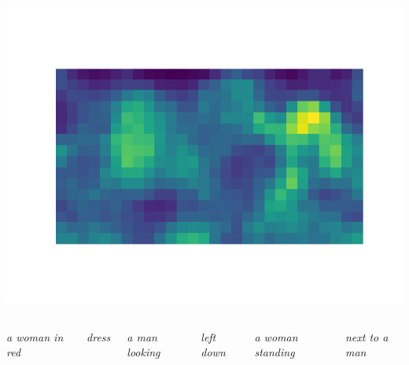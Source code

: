 \documentclass{beamer}
\begin{document}
\begin{frame}
\begin{columns}[c]
		\centerline{\includegraphics[scale=0.28]{images/example_3.png}}
	\end{columns}

	\begin{columns}[c]
		\centerline{\textit{a woman in red}}
		\centerline{\textit{dress}}

		\centerline{\textit{a man looking}}
		\centerline{\textit{left down}}

		\centerline{\textit{a woman standing}}
		\centerline{\textit{next to a man}}
	\end{columns}
\end{frame}
\end{document}
